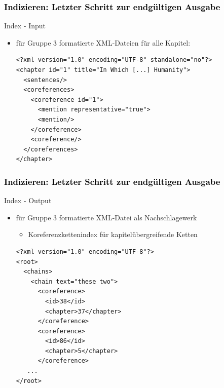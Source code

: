 \documentclass[xcolor=dvipsnames]{beamer}
\begin{document}

\begin{frame}[fragile]\frametitle{\textcolor{black}{Indizieren: Letzter Schritt zur endgültigen Ausgabe}}

\begin{block}{Index - Input}
\begin{itemize}
\item für Gruppe 3 formatierte XML-Dateien für alle Kapitel: 
\begin{small}\begin{verbatim}
<?xml version="1.0" encoding="UTF-8" standalone="no"?>
<chapter id="1" title="In Which [...] Humanity">
  <sentences/>
  <coreferences>
    <coreference id="1">
      <mention representative="true">
      <mention/>
    </coreference>
    <coreference/>
  </coreferences>
</chapter>
\end{verbatim}
\end{small}
\end{itemize}
\end{block}

\end{frame}

\begin{frame}[fragile]\frametitle{\textcolor{black}{Indizieren: Letzter Schritt zur endgültigen Ausgabe}}

\begin{block}{Index - Output}
\begin{itemize}
\item für Gruppe 3 formatierte XML-Datei als Nachschlagewerk
\begin{itemize}
\item Koreferenzkettenindex für kapitelübergreifende Ketten
\end{itemize}
\begin{small}\begin{verbatim}
<?xml version="1.0" encoding="UTF-8"?>
<root>
  <chains>
    <chain text="these two">
      <coreference>
        <id>38</id>
        <chapter>37</chapter>
      </coreference>
      <coreference>
        <id>86</id>
        <chapter>5</chapter>
      </coreference>
   ...
</root>
\end{verbatim}
\end{small}
\end{itemize}
\end{block}

\end{frame}

\end{document}
